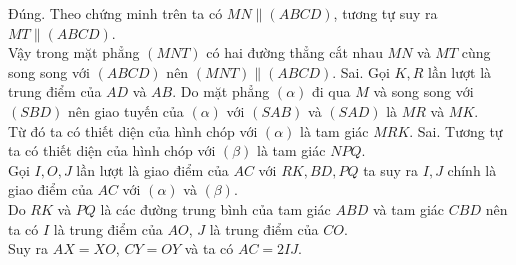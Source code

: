 \begin{ex}
{\begin{itemchoice}
   \itemch Đúng. Theo chứng minh trên ta có $MN\parallel  (ABCD)$, tương tự suy ra $MT \parallel (ABCD)$.\\
   Vậy trong mặt phẳng $(MNT)$ có hai đường thẳng cắt nhau $MN$ và $MT$ cùng song song với $(ABCD)$  nên $(MNT)\parallel (ABCD)$.
   \itemch Sai. Gọi $K, R$ lần lượt là trung điểm của $AD$ và $AB$. Do mặt phẳng $(\alpha)$ đi qua $M$  và song song với $(SBD)$ nên giao tuyến của $(\alpha)$ với $(SAB)$ và $(SAD)$ là $MR$ và $MK$.\\
   Từ đó ta có thiết diện của hình chóp với $(\alpha)$ là tam  giác $MRK$.
   \itemch Sai. Tương tự ta có thiết diện của hình chóp với $(\beta)$ là tam  giác $NPQ$.\\
   Gọi $I, O, J$  lần lượt là giao điểm của $AC$ với $RK, BD, PQ$ ta suy ra $I, J$ chính là giao điểm của $AC$ với $(\alpha)$ và $(\beta)$.\\
   Do $RK$ và $PQ$ là các đường trung bình của tam giác $ABD$ và  tam giác $CBD$ nên ta có $I$ là trung điểm của $AO$, $J$ là trung điểm của $CO$.\\
    Suy ra $AX=XO$, $CY=OY$ và ta có $AC=2IJ$.
  \end{itemchoice}
 } 
\end{ex}
